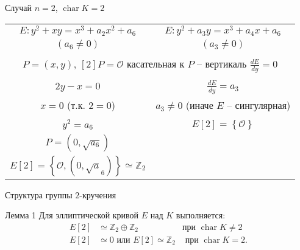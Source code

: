 \documentclass{beamer}
\begin{document}
\begin{frame}{Случай $n = 2$, $\operatorname{char} K = 2$}
    \begin{tabular}{cc}
        $E: {y^2} + xy = {x^3} + {a_2}{x^2} + {a_6}$ & $E:{y^2} + {a_3}y = x^3 + a_4 x + a_6$ \\
        $(a_6 \ne 0)$ & $(a_3 \ne 0)$ \\
        \structure{$ \Downarrow $} & \structure{$ \Downarrow $} \\
        \multicolumn{2}{c}{
            $P = (x,y)$, $[2] P =\mathcal{O}$ \structure{$\Rightarrow$} касательная к $P$ -- вертикаль \structure{$\Rightarrow$} $\frac{{dE}}{{dy}} = 0$
        } \\
        \structure{$ \Downarrow $} & \structure{$ \Downarrow $} \\
        $2y - x = 0$ & $\frac{{dE}}{{dy}} = {a_3}$ \\
        $x = 0$ (т.к. $2=0$) & ${a_3} \ne 0$ (иначе $E$ -- сингулярная) \\
        \structure{$ \Downarrow $} & \structure{$ \Downarrow $} \\
        ${y^2} = a_6$ & $E[2] = \left\{\mathcal{O}\right\}$ \\
        $P = (0, \sqrt{a_6})$ & \\
        $E[2] = \left\{ \mathcal{O}, (0, \sqrt a_6) \right\} \simeq \mathbb{Z}_2$ & \\
    \end{tabular}
\end{frame}

\begin{frame}{Структура группы $2$-кручения}
\begin{block}{Лемма 1}
    Для эллиптической кривой $E$ над $K$ выполняется:
    \begin{align*}
        E[2] & \simeq \mathbb{Z}_2 \oplus \mathbb{Z}_2 & \text{при }\operatorname{char} K \ne 2 \\
        E[2] & \simeq 0 \text{ или } E[2] \simeq \mathbb{Z}_2 & \text{ при } \operatorname{char} K = 2.
    \end{align*}
\end{block}
\end{frame}
\end{document}
